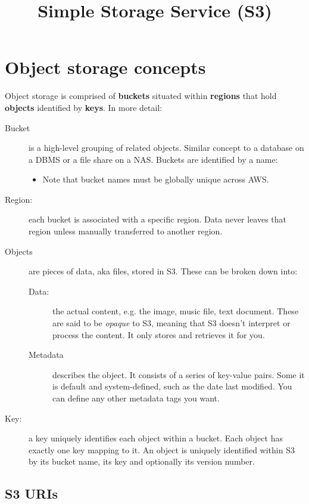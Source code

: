 \documentclass{pgnotes}
\title{Simple Storage Service (S3)}
\begin{document}
\maketitle 

\section{Object storage concepts}

Object storage is comprised of \textbf{buckets} situated within \textbf{regions} that hold \textbf{objects} identified by \textbf{keys}. In more detail:

\begin{description}
\item[Bucket] is a high-level grouping of related objects. Similar concept to a database on a DBMS or a file share on a NAS. Buckets are identified by a name:
  \begin{itemize}
  \item Note that bucket names must be globally unique across AWS.
  \end{itemize}
\item[Region:] each bucket is associated with a specific region. Data never leaves that region unless manually transferred to another region.
\item[Objects] are pieces of data, aka files, stored in S3. These can be broken down into: 
  \begin{description}
  \item[Data:] the actual content, e.g. the image, music file, text document. These are said to be \textit{opaque} to S3, meaning that S3 doesn't interpret or process the content. It only stores and retrieves it for you.
  \item[Metadata] describes the object.  It consists of a series of key-value pairs. Some it is default and system-defined, such as the date last modified.  You can define any other metadata tags you want.
  \end{description}
\item[Key:] a key uniquely identifies each object within a bucket. Each object has exactly one key mapping to it. An object is uniquely identified within S3 by its bucket name, its key and optionally its version number. 
\end{description}

\subsection{S3 URIs}
\end{document}
